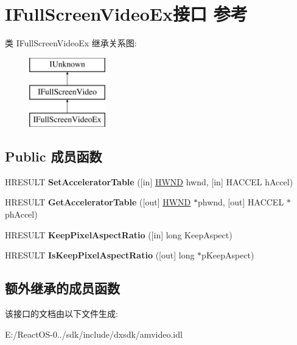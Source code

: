\hypertarget{interface_i_full_screen_video_ex}{}\section{I\+Full\+Screen\+Video\+Ex接口 参考}
\label{interface_i_full_screen_video_ex}
类 I\+Full\+Screen\+Video\+Ex 继承关系图\+:\begin{figure}[H]
\begin{center}
\leavevmode
\includegraphics[height=3.000000cm]{interface_i_full_screen_video_ex}
\end{center}
\end{figure}
\subsection*{Public 成员函数}
\begin{DoxyCompactItemize}
\item 
\mbox{\label{interface_i_full_screen_video_ex_a2240a7b145964202810350b3c09ab4fb}} 
H\+R\+E\+S\+U\+LT {\bfseries Set\+Accelerator\+Table} (\mbox{[}in\mbox{]} \hyperlink{interfacevoid}{H\+W\+ND} hwnd, \mbox{[}in\mbox{]} H\+A\+C\+C\+EL h\+Accel)
\item 
\mbox{\label{interface_i_full_screen_video_ex_a16fe5dbf58e7b8f81ee25a4bd406f4c8}} 
H\+R\+E\+S\+U\+LT {\bfseries Get\+Accelerator\+Table} (\mbox{[}out\mbox{]} \hyperlink{interfacevoid}{H\+W\+ND} $\ast$phwnd, \mbox{[}out\mbox{]} H\+A\+C\+C\+EL $\ast$ph\+Accel)
\item 
\mbox{\label{interface_i_full_screen_video_ex_aa2bc67525824523f583a380772dacea3}} 
H\+R\+E\+S\+U\+LT {\bfseries Keep\+Pixel\+Aspect\+Ratio} (\mbox{[}in\mbox{]} long Keep\+Aspect)
\item 
\mbox{\label{interface_i_full_screen_video_ex_a63a3785a3e0ce9472cb11b2ca8539c0e}} 
H\+R\+E\+S\+U\+LT {\bfseries Is\+Keep\+Pixel\+Aspect\+Ratio} (\mbox{[}out\mbox{]} long $\ast$p\+Keep\+Aspect)
\end{DoxyCompactItemize}
\subsection*{额外继承的成员函数}


该接口的文档由以下文件生成\+:\begin{DoxyCompactItemize}
\item 
E\+:/\+React\+O\+S-\/0../sdk/include/dxsdk/amvideo.\+idl\end{DoxyCompactItemize}
